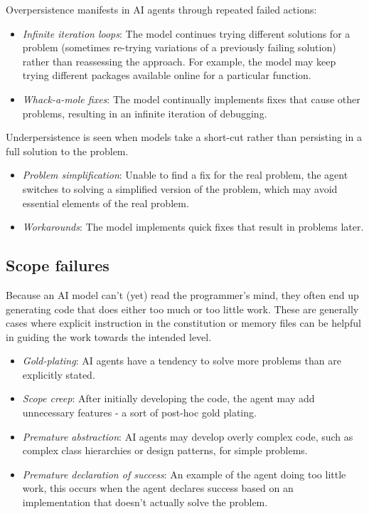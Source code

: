 Overpersistence manifests in AI agents through repeated failed actions:

\begin{itemize}
\item \textit{Infinite iteration loops}: The model continues trying different solutions for a problem (sometimes re-trying variations of a previously failing solution) rather than reassessing the approach. For example, the model may keep trying different packages available online for a particular function.
\item \textit{Whack-a-mole fixes}: The model continually implements fixes that cause other problems, resulting in an infinite iteration of debugging.
\end{itemize}

Underpersistence is seen when models take a short-cut rather than persisting in a full solution to the problem.

\begin{itemize}
\item \textit{Problem simplification}: Unable to find a fix for the real problem, the agent switches to solving a simplified version of the problem, which may avoid essential elements of the real problem.
\item \textit{Workarounds}: The model implements quick fixes that result in problems later.
\end{itemize}

\subsection{Scope failures}

Because an AI model can't (yet) read the programmer's mind, they often end up generating code that does either too much or too little work.  These are generally cases where explicit instruction in the constitution or memory files can be helpful in guiding the work towards the intended level.

\begin{itemize}
\item \textit{Gold-plating}: AI agents have a tendency to solve more problems than are explicitly stated.
\item \textit{Scope creep}: After initially developing the code, the agent may add unnecessary features - a sort of post-hoc gold plating.
\item \textit{Premature abstraction}: AI agents may develop overly complex code, such as complex class hierarchies or design patterns, for simple problems.
\item \textit{Premature declaration of success}: An example of the agent doing too little work, this occurs when the agent declares success based on an implementation that doesn't actually solve the problem.
\end{itemize}

